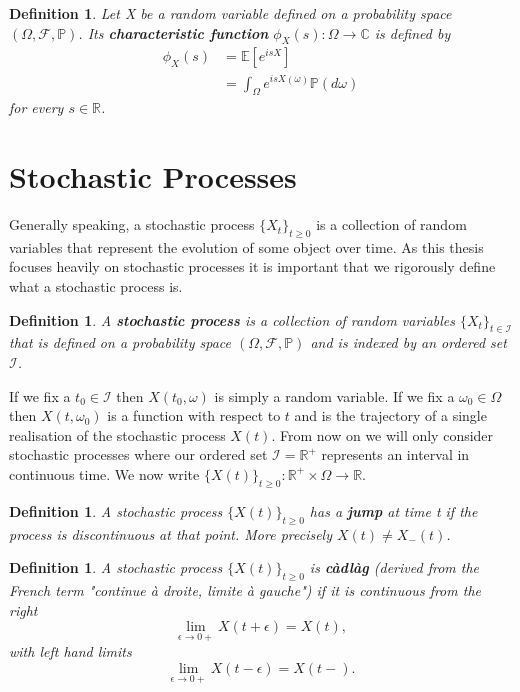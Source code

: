 \documentclass[honours,12pt,twoside, openright]{unswthesis}
\newcommand{\R}{\mathbb{R}}
\newcommand{\C}{\mathbb{C}}
\newcommand{\PP}{\mathbb{P}}
\newcommand{\E}{\mathbb{E}}
\newcommand{\Rp}{\mathbb R^+}
\newcommand{\1}{\mathbf 1}
\newcommand{\FF}{\mathcal{F}}
\newtheorem{definition}[equation]{Definition}
\numberwithin{equation}{section}
\theoremstyle{definition}
\theoremstyle{remark}
\begin{document}
\begin{definition}
	Let X be a random variable defined on a probability space $(\Omega,\FF,\PP)$. Its \textbf{characteristic function} $\phi_X(s):\Omega\to\C$ is defined by 
	\begin{align*}
		\phi_X(s)&=\E[e^{isX}]\\
		&=\int_\Omega e^{isX(\omega)} \PP(d\omega)
	\end{align*}
	for every $s \in \R$.
\end{definition}

\section{Stochastic Processes}
Generally speaking, a stochastic process $\{X_t\}_{t\geq 0}$ is a collection of random variables that represent the evolution of some object over time. As this thesis focuses heavily on stochastic processes it is important that we rigorously define what a stochastic process is.\\

\begin{definition}
A \textbf{stochastic process} is a collection of random variables $\{X_t\}_{t\in \mathcal{I}}$ that is defined on a probability space $(\Omega, \FF,\PP)$ and is indexed by an ordered set $\mathcal{I}$. \\
\end{definition}

\noindent If we fix a $t_0\in \mathcal{I}$ then $X(t_0,\omega)$ is simply a random variable. If we fix a $\omega_0\in \Omega$ then $X(t,\omega_0)$ is a function with respect to $t$ and is the trajectory of a single realisation of the stochastic process $X(t)$. From now on we will only consider stochastic processes where our ordered set $\mathcal{I}=\Rp$ represents an interval in continuous time. We now write $\{X(t)\}_{t\geq 0}:\Rp\times\Omega\to\R$.\\ 

\begin{definition}
A stochastic process $\{X(t)\}_{t\geq 0}$ has a \textbf{jump} at time t if the process is discontinuous at that point. More precisely $X(t) \neq X_-(t)$.\\
\end{definition}

\begin{definition}
A stochastic process $\{X(t)\}_{t\geq 0}$ is \textbf{c\`{a}dl\`{a}g} (derived from the French term "continue \`{a} droite, limite \`{a} gauche") if it is continuous from the right
\[
	\lim_{\epsilon\to0+}X(t+\epsilon)=X(t),
\]
with left hand limits
\[
	\lim_{\epsilon\to0+}X(t-\epsilon)=X(t-).
\]
\end{definition}
\end{document}
